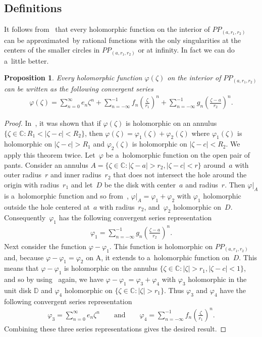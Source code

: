 \documentclass[pdftex]{sigma}
\numberwithin{equation}{section}
\newtheorem{Proposition}[Theorem]{Proposition}
{ \theoremstyle{definition}
\newtheorem{Definition}[Theorem]{Definition}
\newtheorem{Remark}[Theorem]{Remark} }
\begin{document}
\subsection{Definitions}

It follows from~\cite{M} that every holomorphic function on the interior of $PP_{(a, r_1,r_2)}$ can be appro\-xi\-ma\-ted~by
rational functions with the only singularities at the centers of the smaller circles in $PP_{(a, r_1,r_2)}$ or at
inf\/inity.
In fact we can do a~little better.

\begin{Proposition}
Every holomorphic function $\varphi(\zeta)$ on the interior of $PP_{(a, r_1,r_2)}$ can be written as the following
convergent series
\begin{gather*}
\varphi(\zeta)=\sum\limits_{n=0}^\infty e_n\zeta^n+\sum\limits_{n=-\infty}^{-1} f_n\left(\frac{\zeta}{r_1}\right)^n
+ \sum\limits_{n=-\infty}^{-1} g_n\left(\frac{\zeta-a}{r_2}\right)^n.
\end{gather*}
\end{Proposition}

\begin{proof}
In~\cite{Ahlfors}, it was shown that if $\varphi(\zeta)$ is holomorphic on an annulus $\{\zeta\in{\mathbb C}: R_1 <
|\zeta-c|<R_2\}$, then $\varphi(\zeta)=\varphi_1(\zeta)+\varphi_2(\zeta)$ where $\varphi_1(\zeta)$ is holomorphic on
$|\zeta-c|>R_1$ and $\varphi_2(\zeta)$ is holomorphic on $|\zeta-c|<R_2$.
We apply this theorem twice.
Let~$\varphi$ be a~holomorphic function on the open pair of pants.
Consider an annulus $A=\{\zeta\in{\mathbb C}: |\zeta-a|>r_2, |\zeta-c|<r\}$ around~$a$ with outer radius~$r$ and inner
radius~$r_2$ that does not intersect the hole around the origin with radius~$r_1$ and let~$D$ be the disk with
center~$a$ and radius~$r$.
Then $\varphi|_{A}$ is a~holomorphic function and so from~\cite{Ahlfors}, $\varphi|_{A}=\varphi_1+\varphi_2$ with
$\varphi_1$ holomorphic outside the hole centered at~$a$ with radius~$r_2$, and~$\varphi_2$ holomorphic on~$D$.
Consequently~$\varphi_1$ has the following convergent series representation
\begin{gather*}
\varphi_1=\sum\limits_{n=-\infty}^{-1} g_n\left(\frac{\zeta-a}{r_2}\right)^n.
\end{gather*}
Next consider the function $\varphi-\varphi_1$.
This function is holomorphic on $PP_{(a, r_1,r_2)}$ and, because $\varphi-\varphi_1=\varphi_2$ on A, it extends to
a~holomorphic function on~$D$.
This means that $\varphi-\varphi_1$ is holomorphic on the annulus $\{\zeta\in{\mathbb C}: |\zeta|>r_1, |\zeta-c|<1\}$,
and so by using~\cite{Ahlfors} again, we have $\varphi-\varphi_1=\varphi_3+\varphi_4$ with $\varphi_3$ holomorphic
in the unit disk ${\mathbb D}$ and $\varphi_4$ holomorphic on $\{\zeta\in{\mathbb C}: |\zeta|>r_1 \}$.
Thus $\varphi_3$ and $\varphi_4$ have the following convergent series representation
\begin{gather*}
\varphi_3=\sum\limits_{n=0}^\infty e_n \zeta^n
\qquad \text{and} \qquad
\varphi_4=\sum\limits_{n=-\infty}^{-1}f_n\left(\frac{\zeta}{r_1}\right)^n.
\end{gather*}
Combining these three series representations gives the desired result.
\end{proof}
\end{document}
